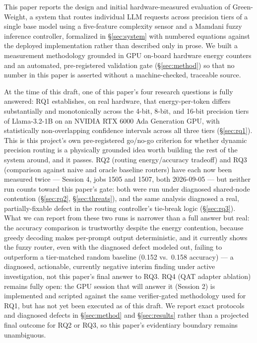 \documentclass[conference]{IEEEtran}
\begin{document}
This paper reports the design and initial hardware-measured evaluation
of Green-Weight, a system that routes individual LLM requests across
precision tiers of a single base model using a five-feature complexity
sensor and a Mamdani fuzzy inference controller, formalized in
\S\ref{sec:system} with numbered equations against the deployed
implementation rather than described only in prose. We built a
measurement methodology grounded in GPU on-board hardware energy
counters and an automated, pre-registered validation gate
(\S\ref{sec:method}) so that no number in this paper is asserted without
a machine-checked, traceable source.

At the time of this draft, one of this paper's four research questions
is fully answered: RQ1 establishes, on real hardware, that
energy-per-token differs substantially and monotonically across the
4-bit, 8-bit, and 16-bit precision tiers of Llama-3.2-1B on an NVIDIA RTX
6000 Ada Generation GPU, with statistically non-overlapping confidence
intervals across all three tiers (\S\ref{sec:rq1}). This is this
project's own pre-registered go/no-go criterion for whether dynamic
precision routing is a physically grounded idea worth building the rest
of the system around, and it passes. RQ2 (routing energy/accuracy
tradeoff) and RQ3 (comparison against naive and oracle baseline routers)
have each now been measured twice --- Session 4, jobs 1505 and 1507, both
2026-09-05 --- but neither run counts toward this paper's gate: both were
run under diagnosed shared-node contention (\S\ref{sec:rq2},
\S\ref{sec:threats}), and the same analysis diagnosed a real,
partially-fixable defect in the routing controller's tie-break logic
(\S\ref{sec:rq3}). What we can report from these two runs is narrower
than a full answer but real: the accuracy comparison is trustworthy
despite the energy contention, because greedy decoding makes per-prompt
output deterministic, and it currently shows the fuzzy router, even with
the diagnosed defect modeled out, failing to outperform a tier-matched
random baseline (0.152 vs.\ 0.158 accuracy) --- a diagnosed, actionable,
currently negative interim finding under active investigation, not this
paper's final answer to RQ3. RQ4 (QAT adapter ablation) remains fully
open: the GPU session that will answer it (Session 2) is implemented and
scripted against the same verifier-gated methodology used for RQ1, but
has not yet been executed as of this draft. We report exact protocols and
diagnosed defects in \S\ref{sec:method} and \S\ref{sec:results} rather
than a projected final outcome for RQ2 or RQ3, so this paper's
evidentiary boundary remains unambiguous.
\end{document}

